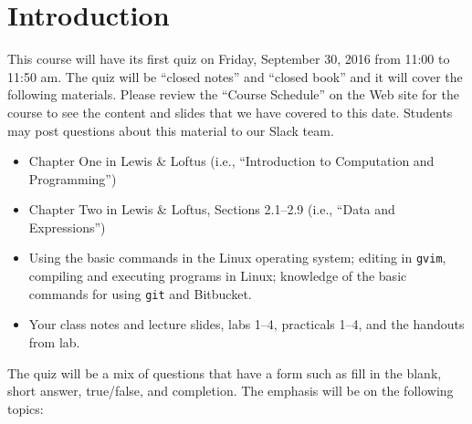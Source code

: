 


\section*{Introduction}

This course will have its first quiz on Friday, September 30, 2016 from 11:00 to 11:50 am. The quiz will be ``closed
notes'' and ``closed book'' and it will cover the following materials. Please review the ``Course Schedule'' on the Web
site for the course to see the content and slides that we have covered to this date. Students may post questions about
this material to our Slack team.

\begin{itemize}

  \itemsep 0in

  \item Chapter One in Lewis \& Loftus (i.e., ``Introduction to Computation and Programming'')

  \item Chapter Two in Lewis \& Loftus, Sections 2.1--2.9 (i.e., ``Data and Expressions'')

  \item Using the basic commands in the Linux operating system; editing in {\tt gvim}, compiling and executing
    programs in Linux; knowledge of the basic commands for using {\tt git} and Bitbucket.

  \item Your class notes and lecture slides, labs 1--4, practicals 1--4, and the handouts from lab.

\end{itemize}

\noindent The quiz will be a mix of questions that have a form such as fill in the blank, short answer, true/false, and
completion. The emphasis will be on the following topics:


